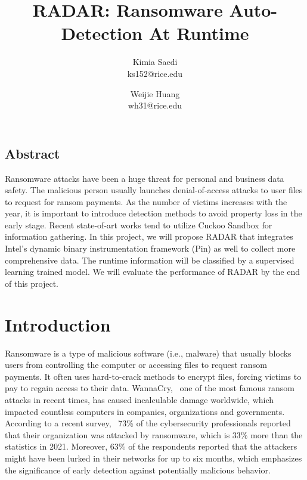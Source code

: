 \documentclass[letterpaper,twocolumn,10pt]{article}
\newcommand{\work}{\mbox{\textsc{RADAR}}\xspace}
\begin{document}
\date{}

\title{\Large \bf \work: Ransomware Auto-Detection At Runtime}

\author{
{\rm Kimia Saedi}\\
ks152@rice.edu
\and
{\rm Weijie Huang}\\
wh31@rice.edu
}

\maketitle



\subsection*{Abstract}

Ransomware attacks have been a huge threat for personal and business data safety. 
The malicious person usually launches denial-of-access attacks to user files to request for ransom payments.
As the number of victims increases with the year, it is important to introduce detection methods to avoid property loss in the early stage.
Recent state-of-art works tend to utilize Cuckoo Sandbox for information gathering.
In this project, we will propose \work that integrates Intel’s dynamic binary instrumentation framework (Pin) as well to collect more comprehensive data.
The runtime information will be classified by a supervised learning trained model.
We will evaluate the performance of \work by the end of this project.

\section{Introduction}

Ransomware is a type of malicious software (i.e., malware) that usually blocks users from controlling the computer or accessing files to request ransom payments.
It often uses hard-to-crack methods to encrypt files, forcing victims to pay to regain access to their data.
WannaCry,~\cite{wannacry_2017} one of the most famous ransom attacks in recent times, has caused incalculable damage worldwide, which impacted countless computers in companies, organizations and governments.
According to a recent survey,~\cite{cybereason_2022} 73\% of the cybersecurity professionals reported that their organization was attacked by ransomware, which is 33\% more than the statistics in 2021.
Moreover, 63\% of the respondents reported that the attackers might have been lurked in their networks for up to six months, which emphasizes the significance of early detection against potentially malicious behavior.
\end{document}
